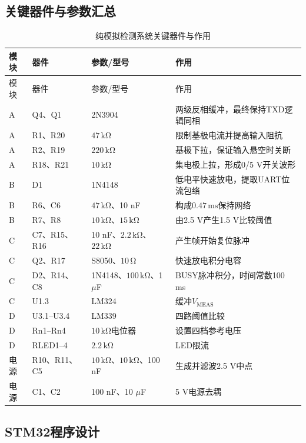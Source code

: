 \documentclass[a4paper]{article}
\newcommand{\unit}[1]{\ensuremath{\,\mathrm{#1}}}
\newcommand{\VMEAS}{V_{\mathrm{MEAS}}}
\begin{document}
\subsection{关键器件与参数汇总}
{\small\setlength{\tabcolsep}{4pt}
\begin{longtable}{p{1.4cm}p{2.9cm}p{3.4cm}p{7.0cm}}
\caption{纯模拟检测系统关键器件与作用}\label{tab:components}\\
\toprule
模块 & 器件 & 参数/型号 & 作用 \\
\midrule
\endfirsthead
\toprule
模块 & 器件 & 参数/型号 & 作用 \\
\midrule
\endhead
A & Q4、Q1 & 2N3904 & 两级反相缓冲，最终保持TXD逻辑同相 \\
A & R1、R20 & $47\unit{k\Omega}$ & 限制基极电流并提高输入阻抗 \\
A & R2、R19 & $220\unit{k\Omega}$ & 基极下拉，保证输入悬空时关断 \\
A & R18、R21 & $10\unit{k\Omega}$ & 集电极上拉，形成0/5 V开关波形 \\
B & D1 & 1N4148 & 低电平快速放电，提取UART位流包络 \\
B & R6、C6 & $47\unit{k\Omega}$、10 nF & 构成$0.47\unit{ms}$保持网络 \\
B & R7、R8 & $10\unit{k\Omega}$、$15\unit{k\Omega}$ & 由2.5 V产生1.5 V比较阈值 \\
C & C7、R15、R16 & 10 nF、$2.2\unit{k\Omega}$、$22\unit{k\Omega}$ & 产生帧开始复位脉冲 \\
C & Q2、R17 & S8050、$10\unit{\Omega}$ & 快速放电积分电容 \\
C & D2、R14、C8 & 1N4148、$100\unit{k\Omega}$、1 $\mu$F & BUSY脉冲积分，时间常数100 ms \\
C & U1.3 & LM324 & 缓冲$\VMEAS$ \\
D & U3.1--U3.4 & LM339 & 四路阈值比较 \\
D & Rn1--Rn4 & $10\unit{k\Omega}$电位器 & 设置四档参考电压 \\
D & RLED1--4 & $2.2\unit{k\Omega}$ & LED限流 \\
电源 & R10、R11、C5 & $10\unit{k\Omega}$、$10\unit{k\Omega}$、100 nF & 生成并滤波2.5 V中点 \\
电源 & C1、C2 & 100 nF、10 $\mu$F & 5 V电源去耦 \\
\bottomrule
\end{longtable}
}

\subsection{STM32程序设计}
\end{document}
